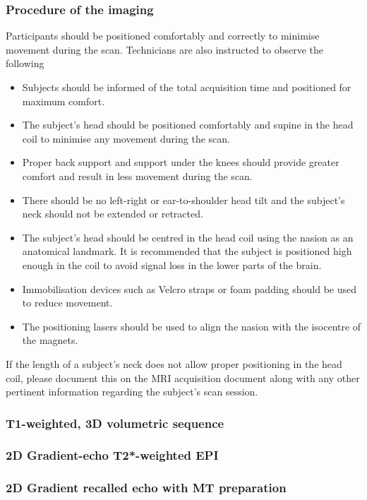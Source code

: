 \subsubsection{Procedure of the imaging}
Participants should be positioned comfortably and correctly to minimise movement during the scan. Technicians are also instructed to observe the following
\begin{itemize}[noitemsep,topsep=0pt]
\item Subjects should be informed of the total acquisition time and positioned for maximum comfort.
\item The subject's head should be positioned comfortably and supine in the head coil to minimise any movement during the scan.
\item Proper back support and support under the knees should provide greater comfort and result in less movement during the scan.
\item There should be no left-right or ear-to-shoulder head tilt and the subject's neck should not be extended or retracted.
\item The subject's head should be centred in the head coil using the nasion as an anatomical landmark. It is recommended that the subject is positioned high enough in the coil to avoid signal loss in the lower parts of the brain.
\item Immobilisation devices such as Velcro straps or foam padding should be used to reduce movement.
\item The positioning lasers should be used to align the nasion with the isocentre of the magnets.
\end{itemize}
If the length of a subject's neck does not allow proper positioning in the head coil, please document this on the \ac{MRI} acquisition document along with any other pertinent information regarding the subject's scan session.

\subsubsection{T1-weighted, 3D volumetric sequence}

\subsubsection{2D Gradient-echo T2*-weighted EPI}


\subsubsection{2D Gradient recalled echo with MT preparation}

